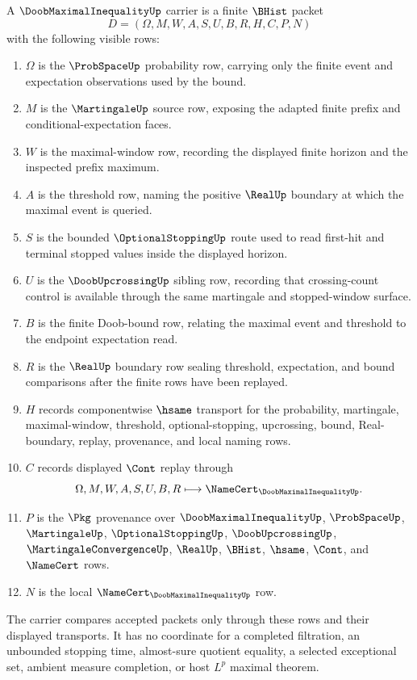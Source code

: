 \begin{definition}
\label{def:doob-maximal-inequality-carrier}
A $\DoobMaximalInequalityUp$ carrier is a finite $\BHist$ packet
$$
D=(\Omega,M,W,A,S,U,B,R,H,C,P,N)
$$
with the following visible rows:
\begin{enumerate}
\item $\Omega$ is the $\ProbSpaceUp$ probability row, carrying only the finite event and expectation observations used by the bound.
\item $M$ is the $\MartingaleUp$ source row, exposing the adapted finite prefix and conditional-expectation faces.
\item $W$ is the maximal-window row, recording the displayed finite horizon and the inspected prefix maximum.
\item $A$ is the threshold row, naming the positive $\RealUp$ boundary at which the maximal event is queried.
\item $S$ is the bounded $\OptionalStoppingUp$ route used to read first-hit and terminal stopped values inside the displayed horizon.
\item $U$ is the $\DoobUpcrossingUp$ sibling row, recording that crossing-count control is available through the same martingale and stopped-window surface.
\item $B$ is the finite Doob-bound row, relating the maximal event and threshold to the endpoint expectation read.
\item $R$ is the $\RealUp$ boundary row sealing threshold, expectation, and bound comparisons after the finite rows have been replayed.
\item $H$ records componentwise $\hsame$ transport for the probability, martingale, maximal-window, threshold, optional-stopping, upcrossing, bound, Real-boundary, replay, provenance, and local naming rows.
\item $C$ records displayed $\Cont$ replay through
$$
\Omega,M,W,A,S,U,B,R \longmapsto \NameCert_{\DoobMaximalInequalityUp}.
$$
\item $P$ is the $\Pkg$ provenance over $\DoobMaximalInequalityUp$, $\ProbSpaceUp$, $\MartingaleUp$, $\OptionalStoppingUp$, $\DoobUpcrossingUp$, $\MartingaleConvergenceUp$, $\RealUp$, $\BHist$, $\hsame$, $\Cont$, and $\NameCert$ rows.
\item $N$ is the local $\NameCert_{\DoobMaximalInequalityUp}$ row.
\end{enumerate}
The carrier compares accepted packets only through these rows and their displayed transports. It has no coordinate for a completed filtration, an unbounded stopping time, almost-sure quotient equality, a selected exceptional set, ambient measure completion, or host $L^p$ maximal theorem.
\end{definition}

